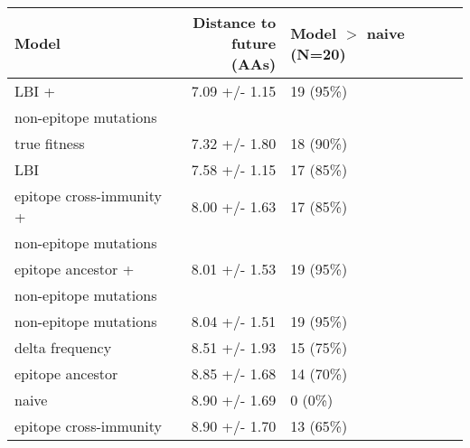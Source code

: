 \begin{tabular*}{0.7\textwidth}{lrl}
\toprule
                             Model & \makecell{Distance to \\ future (AAs)} & \makecell[l]{Model $>$ naive \\ (N=20)} \\
\midrule
                             LBI + &                          7.09 +/- 1.15 &                               19 (95\%) \\
 \hspace{3mm}non-epitope mutations &                                        &                                         \\
                      true fitness &                          7.32 +/- 1.80 &                               18 (90\%) \\
                               LBI &                          7.58 +/- 1.15 &                               17 (85\%) \\
          epitope cross-immunity + &                          8.00 +/- 1.63 &                               17 (85\%) \\
 \hspace{3mm}non-epitope mutations &                                        &                                         \\
                epitope ancestor + &                          8.01 +/- 1.53 &                               19 (95\%) \\
 \hspace{3mm}non-epitope mutations &                                        &                                         \\
             non-epitope mutations &                          8.04 +/- 1.51 &                               19 (95\%) \\
                   delta frequency &                          8.51 +/- 1.93 &                               15 (75\%) \\
                  epitope ancestor &                          8.85 +/- 1.68 &                               14 (70\%) \\
                             naive &                          8.90 +/- 1.69 &                                 0 (0\%) \\
            epitope cross-immunity &                          8.90 +/- 1.70 &                               13 (65\%) \\
\bottomrule
\end{tabular*}
